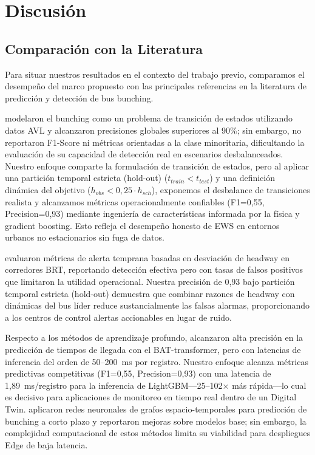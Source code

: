 \documentclass[fleqn,10pt,lineno]{wlpeerj}
\begin{document}
\section{Discusi\'on}
\label{sec:discussion}

\subsection{Comparaci\'on con la Literatura}

Para situar nuestros resultados en el contexto del trabajo previo, comparamos el desempe\~no del marco propuesto con las principales referencias en la literatura de predicci\'on y detecci\'on de bus bunching.

\citet{3} modelaron el bunching como un problema de transici\'on de estados utilizando datos AVL y alcanzaron precisiones globales superiores al 90\%; sin embargo, no reportaron F1-Score ni m\'etricas orientadas a la clase minoritaria, dificultando la evaluaci\'on de su capacidad de detecci\'on real en escenarios desbalanceados. Nuestro enfoque comparte la formulaci\'on de transici\'on de estados, pero al aplicar una partici\'on temporal estricta (hold-out) ($t_{train} < t_{test}$) y una definici\'on din\'amica del objetivo ($h_{obs} < 0,25 \cdot h_{sch}$), exponemos el desbalance de transiciones realista y alcanzamos m\'etricas operacionalmente confiables (F1=0,55, Precision=0,93) mediante ingenier\'ia de caracter\'isticas informada por la f\'isica y gradient boosting. Esto refleja el desempe\~no honesto de EWS en entornos urbanos no estacionarios sin fuga de datos.

\citet{8} evaluaron m\'etricas de alerta temprana basadas en desviaci\'on de headway en corredores BRT, reportando detecci\'on efectiva pero con tasas de falsos positivos que limitaron la utilidad operacional. Nuestra precisi\'on de 0,93 bajo partici\'on temporal estricta (hold-out) demuestra que combinar razones de headway con din\'amicas del bus l\'ider reduce sustancialmente las falsas alarmas, proporcionando a los centros de control alertas accionables en lugar de ruido.

Respecto a los m\'etodos de aprendizaje profundo, \citet{19} alcanzaron alta precisi\'on en la predicci\'on de tiempos de llegada con el BAT-transformer, pero con latencias de inferencia del orden de 50--200~ms por registro. Nuestro enfoque alcanza m\'etricas predictivas competitivas (F1=0,55, Precision=0,93) con una latencia de 1,89~ms/registro para la inferencia de LightGBM---25--102$\times$ m\'as r\'apida---lo cual es decisivo para aplicaciones de monitoreo en tiempo real dentro de un Digital Twin. \citet{30} aplicaron redes neuronales de grafos espacio-temporales para predicci\'on de bunching a corto plazo y reportaron mejoras sobre modelos base; sin embargo, la complejidad computacional de estos m\'etodos limita su viabilidad para despliegues Edge de baja latencia.
\end{document}
